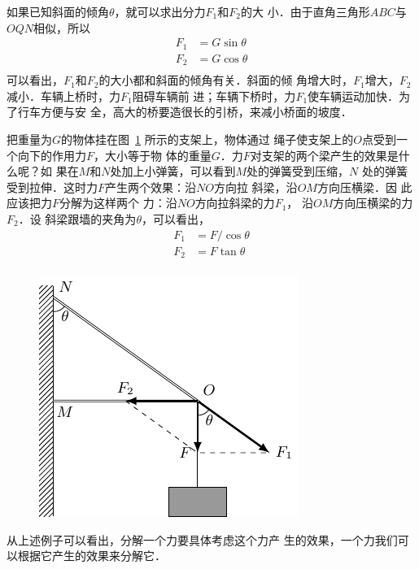     如果已知斜面的倾角$\theta$，就可以求出分力$F_1$和$F_2$的大
小．由于直角三角形$ABC$与$OQN$相似，所以
\[\begin{split} 
F_1&= G\sin\theta \\
F_2&= G\cos\theta \\
\end{split}  \]
可以看出，$F_1$和$F_2$的大小都和斜面的倾角有关．斜面的倾
角增大时，$F_1$增大，$F_2$减小．车辆上桥时，力$F_1$阻碍车辆前
进；车辆下桥时，力$F_1$使车辆运动加快．为了行车方便与安
全，高大的桥要造很长的引桥，来减小桥面的坡度．

    把重量为$G$的物体挂在图~\ref{fig_A_1-30} 所示的支架上，物体通过
绳子使支架上的$O$点受到一个向下的作用力$F$，大小等于物
体的重量$G$．力$F$对支架的两个梁产生的效果是什么呢？如
果在$M$和$N$处加上小弹簧，可以看到$M$处的弹簧受到压缩，$N$
处的弹簧受到拉伸．这时力$F$产生两个效果：沿$NO$方向拉
斜梁，沿$OM$方向压横梁．因
此应该把力$F$分解为这样两个
力：沿$NO$方向拉斜梁的力$F_1$，
沿$OM$方向压横梁的力$F_2$．设
斜梁跟墙的夹角为$\theta$，可以看出，
\[\begin{split} 
F_1&= F/\cos\theta \\
F_2&= F\tan\theta \\
\end{split}  \]

\begin{figure}[htbp]
    \centering
    \includegraphics{fig/A/1-30.pdf}
    \caption{} \label{fig_A_1-30}
\end{figure} 

    从上述例子可以看出，分解一个力要具体考虑这个力产
生的效果，一个力我们可以根据它产生的效果来分解它．


